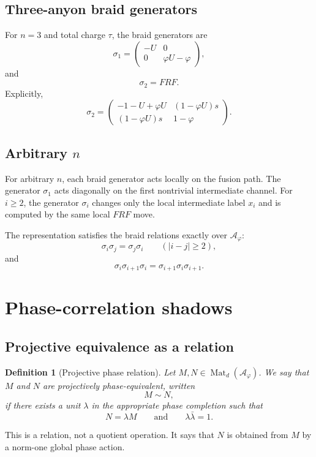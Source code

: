 \documentclass[11pt]{article}
\newtheorem{definition}{Definition}[section]
\newcommand{\ph}{\varphi}
\newcommand{\A}{\mathcal A}
\newcommand{\Mat}{\operatorname{Mat}}
\begin{document}
\subsection{Three-anyon braid generators}

For $n=3$ and total charge $\tau$, the braid generators are
\[
    \sigma_1=
    \begin{pmatrix}
    -U & 0\\
    0 & \ph U-\ph
    \end{pmatrix},
\]
and
\[
    \sigma_2=FRF.
\]
Explicitly,
\[
    \sigma_2=
    \begin{pmatrix}
    -1-U+\ph U & (1-\ph U)s\\
    (1-\ph U)s & 1-\ph
    \end{pmatrix}.
\]

\subsection{Arbitrary $n$}

For arbitrary $n$, each braid generator acts locally on the fusion path.  The generator $\sigma_1$ acts diagonally on the first nontrivial intermediate channel.  For $i\ge2$, the generator $\sigma_i$ changes only the local intermediate label $x_i$ and is computed by the same local $FRF$ move.

The representation satisfies the braid relations exactly over $\A_\ph$:
\[
    \sigma_i\sigma_j=\sigma_j\sigma_i
    \qquad(|i-j|\ge2),
\]
and
\[
    \sigma_i\sigma_{i+1}\sigma_i
    =
    \sigma_{i+1}\sigma_i\sigma_{i+1}.
\]

\section{Phase-correlation shadows}

\subsection{Projective equivalence as a relation}

\begin{definition}[Projective phase relation]
Let $M,N\in\Mat_d(\A_\ph)$.  We say that $M$ and $N$ are projectively phase-equivalent, written
\[
    M\sim N,
\]
if there exists a unit $\lambda$ in the appropriate phase completion such that
\[
    N=\lambda M
    \qquad\text{and}\qquad
    \lambda\bar\lambda=1.
\]
\end{definition}

This is a relation, not a quotient operation.  It says that $N$ is obtained from $M$ by a norm-one global phase action.
\end{document}
